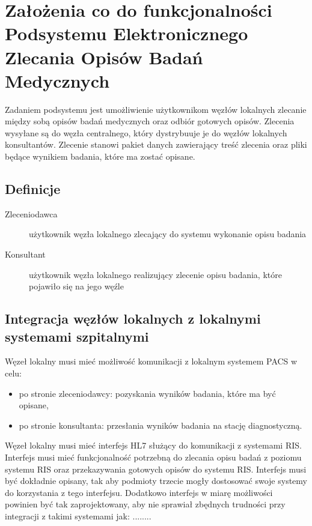 \documentclass[a4paper]{article}
\begin{document}
\section{Założenia co do funkcjonalności Podsystemu Elektronicznego Zlecania Opisów Badań Medycznych}

Zadaniem podsystemu jest umożliwienie użytkownikom węzłów lokalnych zlecanie między sobą opisów 
badań medycznych oraz odbiór gotowych opisów. Zlecenia wysyłane są do węzła centralnego, który 
dystrybuuje je do węzłów lokalnych konsultantów. Zlecenie stanowi pakiet danych zawierający treść 
zlecenia oraz pliki będące wynikiem badania, które ma zostać opisane. 

\subsection{Definicje}

\begin{description}
\item[Zleceniodawca] użytkownik węzła lokalnego zlecający do systemu wykonanie opisu badania
\item[Konsultant] użytkownik węzła lokalnego realizujący zlecenie opisu badania, które pojawiło się na jego węźle
\end{description}

\subsection{Integracja węzłów lokalnych z lokalnymi systemami szpitalnymi}

Węzeł lokalny musi mieć możliwość komunikacji z lokalnym systemem PACS w celu:
\begin{itemize}
 \item po stronie zleceniodawcy: pozyskania wyników badania, które ma być opisane,
 \item po stronie konsultanta: przesłania wyników badania na stację diagnostyczną.
\end{itemize}

Węzeł lokalny musi mieć interfejs HL7 służący do komunikacji z systemami RIS. Interfejs musi mieć funkcjonalność 
potrzebną do zlecania opisu badań z poziomu systemu RIS oraz przekazywania gotowych opisów do systemu RIS. 
Interfejs musi być dokładnie opisany, tak aby podmioty trzecie mogły dostosować swoje systemy do korzystania 
z tego interfejsu. Dodatkowo interfejs w miarę możliwości powinien być tak zaprojektowany, aby nie sprawiał 
zbędnych trudności przy integracji z takimi systemami jak: ........
\end{document}
